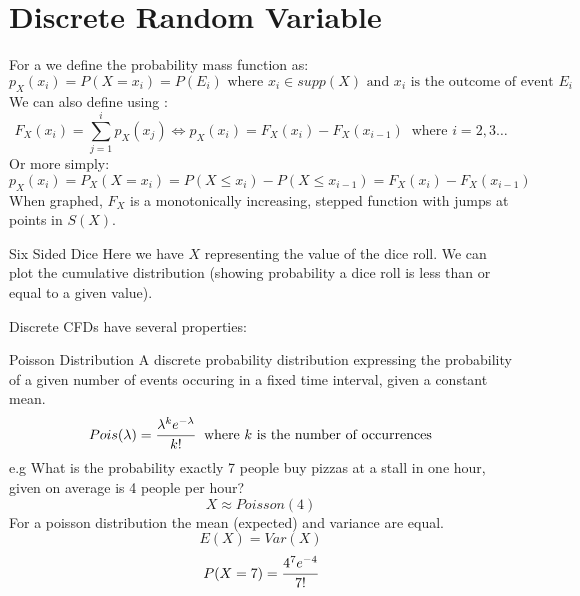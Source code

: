 \section{Discrete Random Variable}
For a  we define the probability mass function as:
\[p_X(x_i) = P(X = x_i) = P(E_i) \text{ where } x_i \in supp(X) \text{ and } x_i \text{ is the outcome of event } E_i\]
We can also define using :
\[F_X(x_i) = \sum^{i}_{j = 1}p_X(x_j) \Leftrightarrow p_X(x_i) = F_X(x_i) - F_X(x_{i-1}) \ \text{ where } i = 2, 3 \dots\]
Or more simply:
\[p_X(x_i) = P_X(X = x_i) = P(X \leq x_i) - P(X \leq x_{i-1}) = F_X(x_i) - F_X(x_{i-1})\]
When graphed, $F_X$ is a monotonically increasing, stepped function with jumps at points in $S(X)$.
\begin{examplebox}{Six Sided Dice}
	Here we have $X$ representing the value of the dice roll. We can plot the cumulative distribution (showing probability a dice roll is less than or equal to a given value).
\end{examplebox}

Discrete CFDs have several properties:
\begin{itemize}
\end{itemize}

\begin{definitionbox}{Poisson Distribution}
A discrete probability distribution expressing the probability of a given number of events occuring in a fixed time interval, given a constant mean.
\[Pois(\lambda) = \cfrac{\lambda^ke^{-\lambda}}{k!} \ \text{ where } k \text{ is the number of occurrences}\]
e.g What is the probability exactly 7 people buy pizzas at a stall in one hour, given on average is 4 people per hour?
\[X \approx Poisson(4)\]
For a poisson distribution the mean (expected) and variance are equal.
\[E(X) = Var(X)\]
\[P(X = 7) = \cfrac{4^7e^{-4}}{7!}\]
\end{definitionbox}

